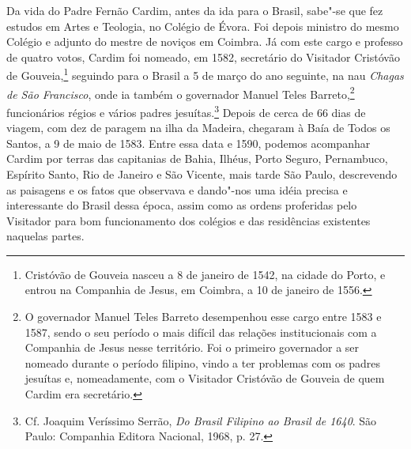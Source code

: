  Da vida do Padre Fernão Cardim, antes da ida para o Brasil, sabe"-se
que fez estudos em Artes e Teologia, no Colégio de Évora. Foi depois
ministro do mesmo Colégio e adjunto do mestre de noviços em Coimbra. Já
com este cargo e professo de quatro votos, Cardim foi nomeado, em 1582,
secretário do Visitador Cristóvão de Gouveia,\footnote{ Cristóvão
de Gouveia nasceu a 8 de janeiro de 1542, na cidade do Porto, e entrou
na Companhia de Jesus, em Coimbra, a 10 de janeiro de 1556.} 
seguindo para o Brasil a 5 de março do ano seguinte, na nau
\textit{Chagas de São Francisco}, onde ia também o governador Manuel
Teles Barreto,\footnote{ O governador Manuel Teles Barreto
desempenhou esse cargo entre 1583 e 1587, sendo o seu período o mais
difícil das relações institucionais com a Companhia de Jesus nesse
território. Foi o primeiro governador a ser nomeado durante o período
filipino, vindo a ter problemas com os padres jesuítas e, nomeadamente,
com o Visitador Cristóvão de Gouveia de quem Cardim era secretário.} 
funcionários régios e vários padres jesuítas.\footnote{ Cf.
Joaquim Veríssimo Serrão, \textit{Do Brasil Filipino ao Brasil de 1640}. 
São Paulo: Companhia Editora Nacional, 1968, p. 27.} Depois de cerca
de 66 dias de viagem, com dez de paragem na ilha da
Madeira, chegaram à Baía de Todos os Santos, a 9 de maio de 1583. Entre
essa data e 1590, podemos acompanhar Cardim por terras das capitanias
de Bahia, Ilhéus, Porto Seguro, Pernambuco, Espírito Santo, Rio de
Janeiro e São Vicente, mais tarde São Paulo, descrevendo as paisagens e
os fatos que observava e dando"-nos uma idéia precisa e interessante do
Brasil dessa época, assim como as ordens proferidas pelo Visitador para
bom funcionamento dos colégios e das residências existentes naquelas partes.

